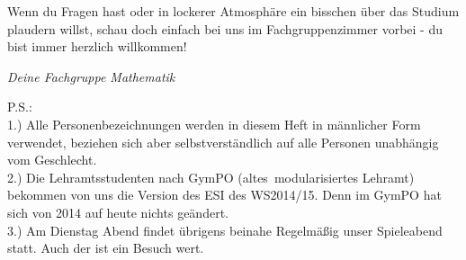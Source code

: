 
Wenn du Fragen hast oder in lockerer Atmosphäre
ein bisschen über das Studium plaudern willst,
schau doch einfach bei uns im Fachgruppenzimmer vorbei
- du bist immer herzlich willkommen!

\begin{flushright}{ \it Deine Fachgruppe Mathematik}
\end{flushright}
\vspace*{\fill}
{\small P.S.:\\
1.) Alle Personenbezeichnungen werden in diesem Heft
in männlicher Form verwendet,
beziehen sich aber selbstverständlich
auf alle Personen unabhängig vom Geschlecht.\\[2pt]
2.) Die Lehramtsstudenten nach GymPO
(\glqq altes\glqq\ modularisiertes Lehramt)
bekommen von uns die Version des ESI des WS2014/15.
Denn im GymPO hat sich von 2014 auf heute nichts geändert.\\[2pt]
3.) Am Dienstag Abend findet übrigens beinahe Regelmäßig
unser Spieleabend statt.
Auch der ist ein Besuch wert.}


